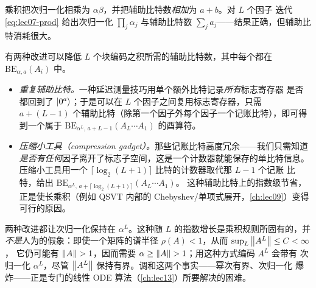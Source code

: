 乘积把次归一化相乘为 $\alpha\beta$，并把辅助比特数\emph{相加}为 $a+b$。对 $L$ 个因子
迭代 \eqref{eq:lec07-prod} 给出次归一化 $\prod_{j}\alpha_j$ 与辅助比特数
$\sum_j a_j$——结果正确，但辅助比特消耗很大。

\begin{remark}[重复辅助比特与压缩小工具的代价对比]
\label{rem:lec07-compress}
有两种改进可以降低 $L$ 个块编码之积所需的辅助比特数，其中每个都在
$\mathrm{BE}_{\alpha,a}(A_i)$ 中。
\begin{itemize}[leftmargin=1.4em,nosep]
  \item \emph{重复辅助比特。}一种延迟测量技巧用单个额外比特记录\emph{所有}标志寄存器
        是否都回到了 $\ket{0^a}$；于是可以在 $L$ 个因子之间复用标志寄存器，只需
        $a+(L-1)$ 个辅助比特（除第一个因子外每个因子一个记账比特），即可得到一个属于
        $\mathrm{BE}_{\alpha^{L},\,a+L-1}(A_L\cdots A_1)$ 的酉算符。
  \item \emph{压缩小工具（compression gadget）。}那些记账比特高度冗余——我们只需知道
        \emph{是否有任何}因子离开了标志子空间，这是一个计数器就能保存的单比特信息。
        压缩小工具用一个 $\lceil\log_2(L+1)\rceil$ 比特的计数器取代那 $L-1$ 个记账
        比特，给出 $\mathrm{BE}_{\alpha^{L},\,a+\lceil\log_2(L+1)\rceil}(A_L\cdots A_1)$。
        这种辅助比特上的指数级节省，正是使长乘积（例如 QSVT 内部的
        Chebyshev/单项式展开，\cref{ch:lec09}）变得可行的原因。
\end{itemize}
两种改进都让次归一化保持在 $\alpha^L$。这种随 $L$ 的指数增长是乘积规则所固有的，并
\emph{不是}人为的假象：即使一个矩阵的谱半径 $\rho(A)<1$，从而 $\sup_L\left\lVert A^L \right\rVert\le C<\infty$，
它仍可能有 $\left\lVert A \right\rVert>1$，因而需要 $\alpha\ge\left\lVert A \right\rVert>1$；用这种方式编码 $A^L$ 会带有
次归一化 $\alpha^L$，尽管 $\left\lVert A^L \right\rVert$ 保持有界。调和这两个事实——幂次有界、次归一化
爆炸——正是专门的线性 ODE 算法（\cref{ch:lec13}）所要解决的困难。
\end{remark}

